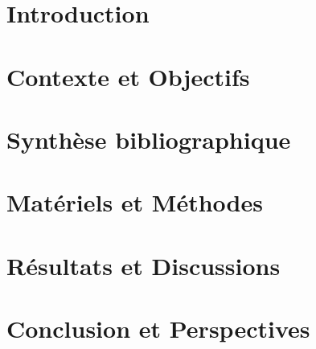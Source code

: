\documentclass[a4paper,12pt,oneside,chapterprefix=false]{scrbook}
\begin{document}
  \tableofcontents
  \listoffigures
  \listoftables
  
  \printglossary[type=\acronymtype,title=Glossaire]
  

\mainmatter

  \chapter{Introduction}
  
  
  
  \chapter{Contexte et Objectifs}
  
  

  \chapter{Synthèse bibliographique}
  
  

  \chapter{Matériels et Méthodes}
  
  

  \chapter{Résultats et Discussions}
  
  
  
  \chapter{Conclusion et Perspectives}
  
  
  
\appendix



\backmatter

\cleardoublepage
{}


  
\end{document}

